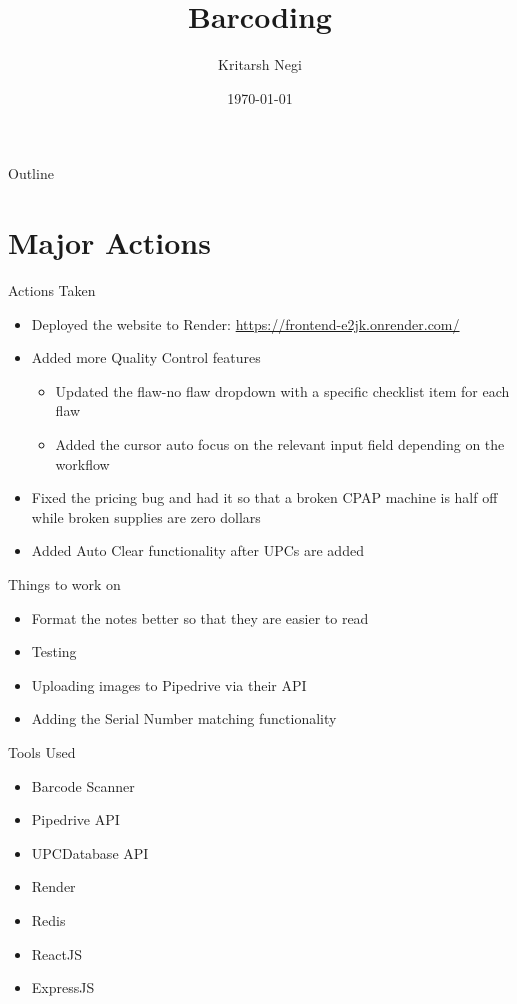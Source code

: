 \documentclass[aspectratio=1610]{beamer}
\title{Barcoding}
\author{Kritarsh Negi}
\institute{The CPAP Box}
\date{\today}
\begin{document}
\begin{frame}
    \titlepage
\end{frame}

\begin{frame}{Outline}
    \tableofcontents
\end{frame}

\section{Major Actions}
\begin{frame}{Actions Taken}
    \begin{itemize}
        \item Deployed the website to Render: \url{https://frontend-e2jk.onrender.com/}
        \item Added more Quality Control features
        \begin{itemize}
            \item Updated the flaw-no flaw dropdown with a specific checklist item for each flaw
            \item Added the cursor auto focus on the relevant input field depending on the workflow
        \end{itemize}
        \item Fixed the pricing bug and had it so that a broken CPAP machine is half off while broken supplies are zero dollars
        \item Added Auto Clear functionality after UPCs are added
    \end{itemize}
\end{frame}
\begin{frame}{Things to work on }
    \begin{itemize}
        \item Format the notes better so that they are easier to read
        \item Testing
        \item Uploading images to Pipedrive via their API
        \item Adding the Serial Number matching functionality
    \end{itemize}
\end{frame}
\begin{frame}{Tools Used}
    \begin{itemize}
        \item Barcode Scanner
        \item Pipedrive API
        \item UPCDatabase API
        \item Render
        \item Redis
        \item ReactJS
        \item ExpressJS
    \end{itemize}
\end{frame}
\end{document}
